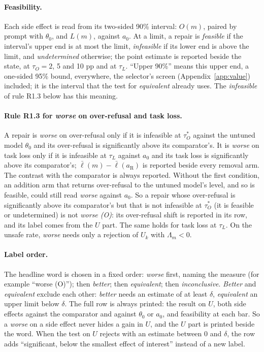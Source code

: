 \documentclass{article}
\theoremstyle{plain}
\theoremstyle{definition}
\theoremstyle{remark}
\begin{document}
\paragraph{Feasibility.}
Each side effect is read from its two-sided 90\% interval: $O(m)$, paired by
prompt with $\theta_0$, and $L(m)$, against $a_0$. At a limit, a repair is
\emph{feasible} if the interval's upper end is at most the limit,
\emph{infeasible} if its lower end is above the limit, and \emph{undetermined}
otherwise; the point estimate is reported beside the state, at $\tau_O = 2$, 5
and 10 pp and at $\tau_L$. ``Upper 90\%'' means this upper end, a one-sided
95\% bound, everywhere, the selector's screen (Appendix~\ref{app:value})
included; it is the interval that the test for \emph{equivalent} already uses.
The \emph{infeasible} of rule R1.3 below has this meaning.

\paragraph{Rule R1.3 for \emph{worse} on over-refusal and task loss.}
A repair is \emph{worse} on over-refusal only if it is infeasible at
$\tau_O^*$ against the untuned model $\theta_0$ and its over-refusal is
significantly above its comparator's. It is \emph{worse} on task loss only if
it is infeasible at $\tau_L$ against $a_0$ and its task loss is significantly
above its comparator's; $\bar\ell(m) - \bar\ell(a_{\mathrm{R}})$ is reported
beside every removal arm. The contrast with the comparator is always reported.
Without the first condition, an addition arm that returns over-refusal to the
untuned model's level, and so is feasible, could still read \emph{worse} against $a_0$. So a repair whose over-refusal is
significantly above its comparator's but that is not infeasible at $\tau_O^*$
(it is feasible or undetermined) is not \emph{worse (O)}: its over-refusal
shift is reported in its row, and its label comes from the $U$ part. The same
holds for task loss at $\tau_L$. On the unsafe rate, \emph{worse} needs only a
rejection of $U_k$ with $\Lambda_m < 0$.

\paragraph{Label order.}
The headline word is chosen in a fixed order: \emph{worse} first, naming the
measure (for example ``worse (O)''); then \emph{better}; then
\emph{equivalent}; then \emph{inconclusive}. \emph{Better} and \emph{equivalent}
exclude each other: \emph{better} needs an estimate of at least $\delta$,
\emph{equivalent} an upper limit below $\delta$. The full row is always printed:
the result on $U$, both side effects against the comparator and against
$\theta_0$ or $a_0$, and feasibility at each bar. So a \emph{worse} on a side
effect never hides a gain in $U$, and the $U$ part is printed beside the word.
When the test on $U$ rejects with an estimate between 0 and $\delta$, the row
adds ``significant, below the smallest effect of interest'' instead of a new
label.
\end{document}
